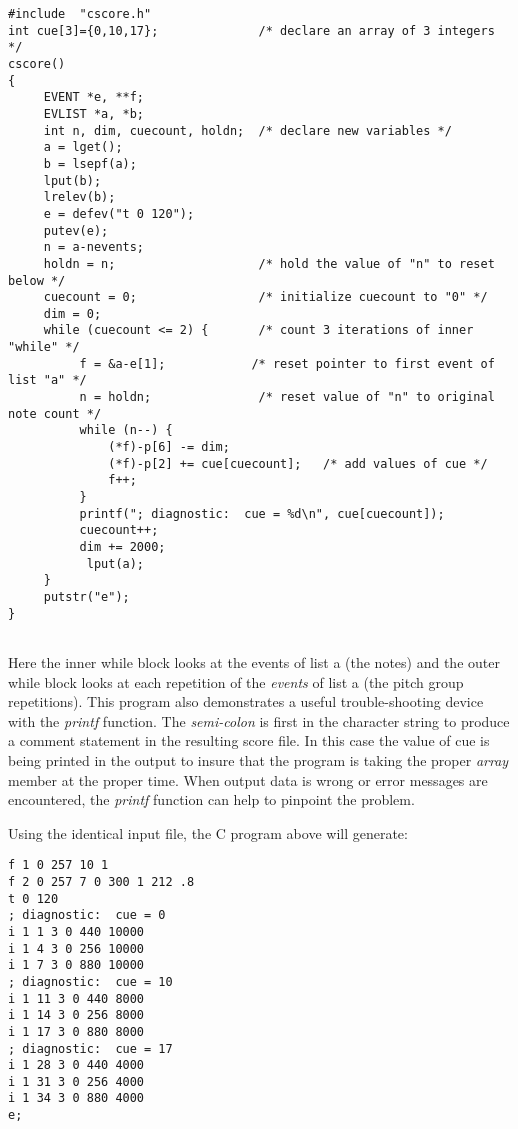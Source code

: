  
\begin{lstlisting}
#include  "cscore.h" 
int cue[3]={0,10,17};              /* declare an array of 3 integers */ 
cscore() 
{
     EVENT *e, **f;
     EVLIST *a, *b;
     int n, dim, cuecount, holdn;  /* declare new variables */ 
     a = lget(); 
     b = lsepf(a); 
     lput(b); 
     lrelev(b); 
     e = defev("t 0 120"); 
     putev(e); 
     n = a-nevents; 
     holdn = n;                    /* hold the value of "n" to reset below */ 
     cuecount = 0;                 /* initialize cuecount to "0" */ 
     dim = 0; 
     while (cuecount <= 2) {       /* count 3 iterations of inner "while" */ 
          f = &a-e[1];            /* reset pointer to first event of list "a" */ 
          n = holdn;               /* reset value of "n" to original note count */ 
          while (n--) { 
              (*f)-p[6] -= dim; 
              (*f)-p[2] += cue[cuecount];   /* add values of cue */ 
              f++; 
          } 
          printf("; diagnostic:  cue = %d\n", cue[cuecount]); 
          cuecount++; 
          dim += 2000; 
           lput(a); 
     } 
     putstr("e"); 
}
      
\end{lstlisting}


 


  Here the inner while block looks at the events of list a (the notes) and the outer while block looks at each repetition of the\emph{ events}
 of list a (the pitch group repetitions). This program also demonstrates a useful trouble-shooting device with the \emph{printf}
 function. The \emph{semi-colon}
 is first in the character string to produce a comment statement in the resulting score file. In this case the value of cue is being printed in the output to insure that the program is taking the proper \emph{array}
 member at the proper time. When output data is wrong or error messages are encountered, the \emph{printf}
 function can help to pinpoint the problem. 


  Using the identical input file, the C program above will generate: 


 
\begin{lstlisting}
f 1 0 257 10 1 
f 2 0 257 7 0 300 1 212 .8 
t 0 120 
; diagnostic:  cue = 0 
i 1 1 3 0 440 10000 
i 1 4 3 0 256 10000 
i 1 7 3 0 880 10000 
; diagnostic:  cue = 10 
i 1 11 3 0 440 8000 
i 1 14 3 0 256 8000 
i 1 17 3 0 880 8000 
; diagnostic:  cue = 17 
i 1 28 3 0 440 4000 
i 1 31 3 0 256 4000 
i 1 34 3 0 880 4000 
e;
      
\end{lstlisting}


 


\begin{comment}
\begin{tabular}{lcr}
Previous &Home &Next \\
Cscore &Up &More Advanced Examples

\end{tabular}



\end{comment}
